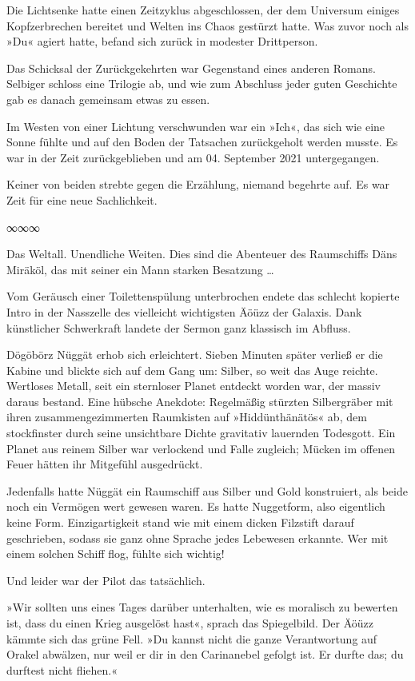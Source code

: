 Die Lichtsenke hatte einen Zeitzyklus abgeschlossen, der dem Universum einiges Kopfzerbrechen bereitet und Welten ins Chaos gestürzt hatte. Was zuvor noch als »Du« agiert hatte, befand sich zurück in modester Drittperson.

Das Schicksal der Zurückgekehrten war Gegenstand eines anderen Romans. Selbiger schloss eine Trilogie ab, und wie zum Abschluss jeder guten Geschichte gab es danach gemeinsam etwas zu essen.

Im Westen von einer Lichtung verschwunden war ein »Ich«, das sich wie eine Sonne fühlte und auf den Boden der Tatsachen zurückgeholt werden musste. Es war in der Zeit zurückgeblieben und am 04. September 2021 untergegangen.

Keiner von beiden strebte gegen die Erzählung, niemand begehrte auf. Es war Zeit für eine neue Sachlichkeit.

\begin{center}
∞∞∞
\end{center}

Das Weltall. Unendliche Weiten. Dies sind die Abenteuer des Raumschiffs Däns Miräköl, das mit seiner ein Mann starken Besatzung …

Vom Geräusch einer Toilettenspülung unterbrochen endete das schlecht kopierte Intro in der Nasszelle des vielleicht wichtigsten Äöüzz der Galaxis. Dank künstlicher Schwerkraft landete der Sermon ganz klassisch im Abfluss.

Dögöbörz Nüggät erhob sich erleichtert. Sieben Minuten später verließ er die Kabine und blickte sich auf dem Gang um: Silber, so weit das Auge reichte. Wertloses Metall, seit ein sternloser Planet entdeckt worden war, der massiv daraus bestand. Eine hübsche Anekdote: Regelmäßig stürzten Silbergräber mit ihren zusammengezimmerten Raumkisten auf »Hiddünthänätös« ab, dem stockfinster durch seine unsichtbare Dichte gravitativ lauernden Todesgott. Ein Planet aus reinem Silber war verlockend und Falle zugleich; Mücken im offenen Feuer hätten ihr Mitgefühl ausgedrückt.

Jedenfalls hatte Nüggät ein Raumschiff aus Silber und Gold konstruiert, als beide noch ein Vermögen wert gewesen waren. Es hatte Nuggetform, also eigentlich keine Form. Einzigartigkeit stand wie mit einem dicken Filzstift darauf geschrieben, sodass sie ganz ohne Sprache jedes Lebewesen erkannte. Wer mit einem solchen Schiff flog, fühlte sich wichtig!

Und leider war der Pilot das tatsächlich.

»Wir sollten uns eines Tages darüber unterhalten, wie es moralisch zu bewerten ist, dass du einen Krieg ausgelöst hast«, sprach das Spiegelbild. Der Äöüzz kämmte sich das grüne Fell. »Du kannst nicht die ganze Verantwortung auf Orakel abwälzen, nur weil er dir in den Carinanebel gefolgt ist. Er durfte das; du durftest nicht fliehen.«

